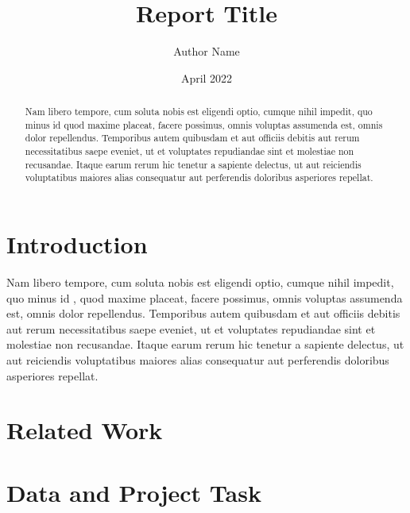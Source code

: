 \documentclass{article}
\title{Report Title}
\author{Author Name }
\date{April 2022}
\begin{document}
\maketitle
\newpage

\tableofcontents
\newpage

\begin{abstract}
    Nam libero tempore, cum soluta nobis est eligendi optio, cumque nihil impedit, quo minus id quod maxime placeat, facere possimus, omnis voluptas assumenda est, omnis dolor repellendus. Temporibus autem quibusdam et aut officiis debitis aut rerum necessitatibus saepe eveniet, ut et voluptates repudiandae sint et molestiae non recusandae. Itaque earum rerum hic tenetur a sapiente delectus, ut aut reiciendis voluptatibus maiores alias consequatur aut perferendis doloribus asperiores repellat.
\end{abstract}
\newpage

\section{Introduction}
Nam libero tempore, cum soluta nobis est eligendi optio, cumque nihil impedit, quo minus id \citet{CG20}, quod maxime placeat, facere possimus, omnis voluptas assumenda est, omnis dolor repellendus. Temporibus autem quibusdam et aut officiis debitis aut rerum necessitatibus saepe eveniet, ut et voluptates repudiandae sint et molestiae non recusandae. Itaque earum rerum hic tenetur a sapiente delectus, ut aut reiciendis voluptatibus maiores alias consequatur aut perferendis doloribus asperiores repellat.

\section{Related Work}

\section{Data and Project Task}
\end{document}
